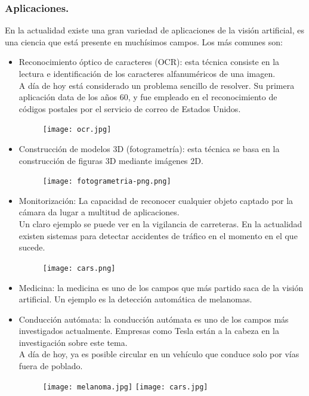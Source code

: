 \documentclass[a4paper,10pt]{article}
\begin{document}
\subsubsection{Aplicaciones.}
En la actualidad existe una gran variedad de aplicaciones de la visión artificial, es una ciencia que está presente en muchísimos campos. Los más comunes son:
\begin{itemize}
\item Reconocimiento óptico de caracteres (OCR): esta técnica consiste en la lectura e identificación de los caracteres alfanuméricos de una imagen.\\ A día de hoy está considerado un problema sencillo de resolver. Su primera aplicación data de los años 60, y fue empleado en el reconocimiento de códigos postales por el servicio de correo de Estados Unidos.
\begin{figure}[H]
\centering
\texttt{[image: ocr.jpg]}
\end{figure}
\item Construcción de modelos 3D (fotogrametría): esta técnica se basa en la construcción de figuras 3D mediante imágenes 2D.
\begin{figure}[H]
\centering
\texttt{[image: fotogrametria-png.png]}
\end{figure}
\item Monitorización: La capacidad de reconocer cualquier objeto captado por la cámara da lugar a multitud de aplicaciones. \\Un claro ejemplo se puede ver en la vigilancia de carreteras. En la actualidad existen sistemas para detectar accidentes de tráfico en el momento en el que sucede.
\begin{figure}[H]
\centering
\texttt{[image: cars.png]}
\end{figure}
\item Medicina: la medicina es uno de los campos que más partido saca de la visión artificial. Un ejemplo es la detección automática de melanomas.
\item Conducción autómata: la conducción autómata es uno de los campos más investigados actualmente. Empresas como Tesla están a la cabeza en la investigación sobre este tema. \\A día de hoy, ya es posible circular en un vehículo que conduce solo por vías fuera de poblado.
\begin{figure}[H]
\centering
\texttt{[image: melanoma.jpg]}\hfill
\texttt{[image: cars.jpg]}
\end{figure}
\end{itemize}
\end{document}
